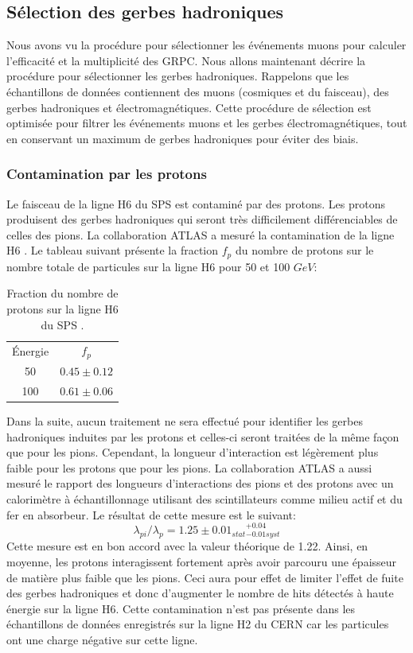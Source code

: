 \subsection{Sélection des gerbes hadroniques}
\label{sec.pi_selection}
Nous avons vu la procédure pour sélectionner les événements muons pour calculer l'efficacité et la multiplicité des GRPC. Nous allons maintenant décrire la procédure pour sélectionner les gerbes hadroniques. Rappelons que les échantillons de données contiennent des muons (cosmiques et du faisceau), des gerbes hadroniques et électromagnétiques. Cette procédure de sélection est optimisée pour filtrer les événements muons et les gerbes électromagnétiques, tout en conservant un maximum de gerbes hadroniques pour éviter des biais. 
\subsubsection{Contamination par les protons}
Le faisceau de la ligne H6 du SPS est contaminé par des protons. Les protons produisent des gerbes hadroniques qui seront très difficilement différenciables de celles des pions. La collaboration ATLAS a mesuré la contamination de la ligne H6 \cite{Abat}. Le tableau suivant présente la fraction $f_p$ du nombre de protons sur le nombre totale de particules sur la ligne H6 pour 50 et 100 $GeV$:
\begin{table}[!ht]
  \begin{center}
    \begin{tabular}{c|c}
      \rowcolor{black!20!white}Énergie & $f_p$\\
      \rowcolor{black!5!white}\hline
      \rowcolor{black!5!white}50 & $0.45\pm0.12$\\
      \rowcolor{black!5!white}100 & $0.61\pm0.06$\\
    \end{tabular}
  \end{center}  
  \caption{Fraction du nombre de protons sur la ligne H6 du SPS \cite{Abat}.}
  \label{tab.fp}
\end{table}
Dans la suite, aucun traitement ne sera effectué pour identifier les gerbes hadroniques induites par les protons et celles-ci seront traitées de la même façon que pour les pions. Cependant, la longueur d’interaction est légèrement plus faible pour les protons que pour les pions. La collaboration ATLAS a aussi mesuré le rapport des longueurs d’interactions des pions et des protons avec un calorimètre à échantillonnage utilisant des scintillateurs comme milieu actif et du fer en absorbeur. Le résultat de cette mesure est le suivant:
\begin{equation}
  \lambda_{pi}/\lambda_{p}=1.25\pm0.01_{stat}{}_{-0.01syst}^{+0.04}
\end{equation}
Cette mesure est en bon accord avec la valeur théorique de 1.22. Ainsi, en moyenne, les protons interagissent fortement après avoir parcouru une épaisseur de matière plus faible que les pions. Ceci aura pour effet de limiter l'effet de fuite des gerbes hadroniques et donc d'augmenter le nombre de hits détectés à haute énergie sur la ligne H6. Cette contamination n'est pas présente dans les échantillons de données enregistrés sur la ligne H2 du CERN car les particules ont une charge négative sur cette ligne.
